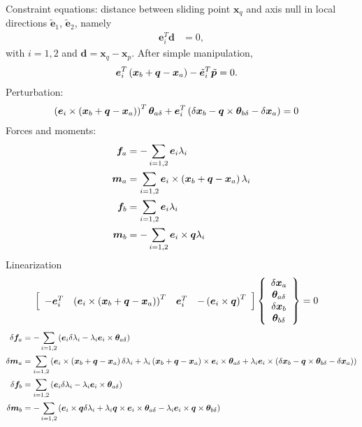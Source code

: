 \documentclass[10pt,dvips,fleqn,subeqn]{report}
\newcommand{\T}[1]{\bm{#1}}
\begin{document}
Constraint equations:
distance between sliding point $\T{x}_q$ and axis null in local directions
$\tilde{\T{e}}_1$, $\tilde{\T{e}}_2$, namely
\begin{align}
	\T{e}_i^T \T{d}
	&=
	0
	,
\end{align}
with $i=1,2$ and $\T{d} = \T{x}_q - \T{x}_p$.
After simple manipulation,
\begin{align}
	\T{e}_i^T \plbr{\T{x}_b + \T{q} - \T{x}_a} - \tilde{\T{e}}_i^T \tilde{\T{p}}
	&=
	0
	.
\end{align}
Perturbation:
\begin{align}
	\plbr{\T{e}_i \times \plbr{\T{x}_b + \T{q} - \T{x}_a}}^T \T{\theta}_{a\delta}
	+ \T{e}_i^T \plbr{
		\delta\T{x}_b
		-
		\T{q} \times \T{\theta}_{b\delta}
		-
		\delta\T{x}_a
	}
	&=
	0
\end{align}
Forces and moments:
\begin{subequations}
\begin{align}
	\T{f}_a
	&=
	- \sum_{i=1,2} \T{e}_i \lambda_i
	\\
	\T{m}_a
	&=
	\sum_{i=1,2} \T{e}_i \times \plbr{\T{x}_b + \T{q} - \T{x}_a} \lambda_i
	\\
	\T{f}_b
	&=
	\sum_{i=1,2} \T{e}_i \lambda_i
	\\
	\T{m}_b
	&=
	- \sum_{i=1,2} \T{e}_i \times \T{q} \lambda_i
\end{align}
\end{subequations}
Linearization
\begin{align}
	\sqbr{\matr{cccc}{
		-\T{e}_i^T
		&
		\plbr{\T{e}_i \times \plbr{\T{x}_b + \T{q} - \T{x}_a}}^T
		&
		\T{e}_i^T
		&
		-\plbr{\T{e}_i \times \T{q}}^T
	}} \cubr{\cvvect{
		\delta\T{x}_a
		\\
		\T{\theta}_{a\delta}
		\\
		\delta\T{x}_b
		\\
		\T{\theta}_{b\delta}
	}}
	&=
	0
\end{align}
\begin{subequations}
\begin{align}
	\delta\T{f}_a
	&=
	-\sum_{i=1,2} \plbr{
		\T{e}_i \delta\lambda_i
		-
		\lambda_i \T{e}_i \times \T{\theta}_{a\delta}
	}
	\\
	\delta\T{m}_a
	&=
	\sum_{i=1,2} \plbr{
		\T{e}_i \times \plbr{\T{x}_b + \T{q} - \T{x}_a} \delta\lambda_i
		+
		\lambda_i \plbr{\T{x}_b + \T{q} - \T{x}_a} \times \T{e}_i \times \T{\theta}_{a\delta}
		+
		\lambda_i \T{e}_i \times \plbr{
			\delta\T{x}_b
			-
			\T{q} \times \T{\theta}_{b\delta}
			-
			\delta\T{x}_a
		}
	}
	\\
	\delta\T{f}_b
	&=
	\sum_{i=1,2} \plbr{
		\T{e}_i \delta\lambda_i
		-
		\lambda_i \T{e}_i \times \T{\theta}_{a\delta}
	}
	\\
	\delta\T{m}_b
	&=
	- \sum_{i=1,2} \plbr{
		\T{e}_i \times \T{q} \delta\lambda_i
		+
		\lambda_i \T{q} \times \T{e}_i \times \T{\theta}_{a\delta}
		-
		\lambda_i \T{e}_i \times \T{q} \times \T{\theta}_{b\delta}
	}
\end{align}
\end{subequations}
\end{document}
